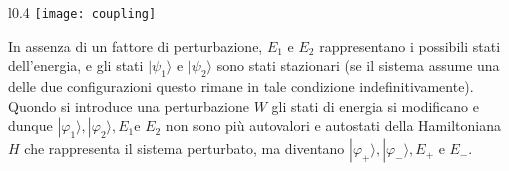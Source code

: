 \begin{wrapfigure}{l}{0.4\textwidth} %
    \texttt{[image: coupling]} %
    \caption{}
\end{wrapfigure}
\vspace{0.3cm}
In assenza di un fattore di perturbazione, $E_1$ e $E_2$ rappresentano i possibili stati dell'energia, e gli stati $|\psi_1 \rangle $ e $|\psi_2 \rangle$ sono stati stazionari (se il sistema assume una delle due configurazioni questo rimane in tale condizione indefinitivamente). Quondo si introduce una perturbazione $W$ gli stati di energia si modificano e dunque $|\varphi_1 \rangle , |\varphi_2 \rangle, E_1$e $E_2$ non sono pi\`u autovalori e autostati della Hamiltoniana $H$ che rappresenta il sistema perturbato, ma diventano $ |\varphi_{+}\rangle ,|\varphi_{-} \rangle  ,E_{+}$ e $E_{-}$.

